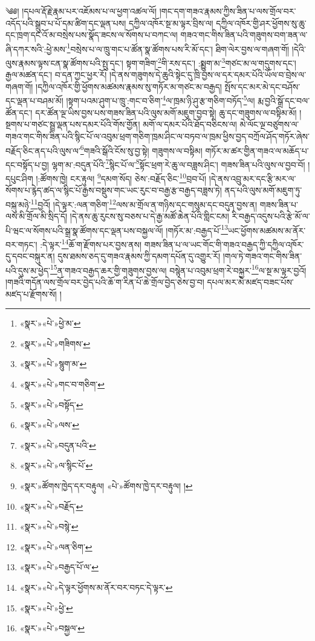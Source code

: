 ༄༅། །དཔལ་རྡོ་རྗེ་རྣམ་པར་འཇོམས་པ་ལ་ཕྱག་འཚལ་ལོ། །གང་དག་གཟའ་རྣམས་ཀྱིས་ཟིན་པ་ལས་གྲོལ་བར་འདོད་པའི་སྒྲུབ་པ་པོ་དམ་ཚིག་དང་ལྡན་པས། དཀྱིལ་འཁོར་སྔ་མ་ལྟར་བྲིས་ལ། དཀྱིལ་འཁོར་གྱི་ཤར་ཕྱོགས་སུ་ཆུ་དང་ཁྲག་དང་འོ་མ་བསྲེས་པས་སྣོད་ཟངས་ལ་སོགས་པ་བཀང་ལ། གཟའ་གང་གིས་ཟིན་པའི་གཟུགས་བག་ཟན་ལ་ཞི་དཀར་སའི་:ཕྱེ་མས་\footnote{«སྣར་»«པེ་»ཕྱེ་མ་}བསྲེས་པ་ལ་ཁྲུ་གང་པ་ཚོན་སྣ་ཚོགས་པས་རི་མོ་དང་། ཐིག་ལེར་བྱས་ལ་གཞག་གོ། །དེའི་ལུས་རྣམས་ལྟས་ངན་སྣ་ཚོགས་པའི་སྤུ་དང་། སྟག་གཟིག་\footnote{«སྣར་»«པེ་»གཟིགས་}གི་རས་དང་། :སྨྱུག་མ་\footnote{«སྣར་»«པེ་»སྙུག་མ་}གཙང་མ་ལ་གདུགས་དང་། རྒྱལ་མཚན་དང་། བ་དན་ཀྱང་ཕྱར་རོ། །དེ་ནས་གཟུགས་དེ་ཆུའི་སྟེང་དུ་ཁྲི་བྱས་ལ་དར་དམར་པོའི་ཡོལ་བ་བྲེས་ལ་གཞག་གོ། །དཀྱིལ་འཁོར་གྱི་ཕྱོགས་མཚམས་རྣམས་སུ་གཏོར་མ་གཙང་མ་བརྒྱད། སྤོས་དང་མར་མེ་དང་བཤོས་དང་ལྡན་པ་བཤམ་མོ། །སྟག་པའམ་ཤུག་པ་ཁྲུ་:གང་བ་ཅིག་\footnote{«སྣར་»«པེ་»གང་བ་གཅིག་}ལ་ཁྲམ་ཉི་ཤུ་རྩ་གཅིག་བཏོད་\footnote{«སྣར་»«པེ་»བསྟོད་}ལ། རྨ་བྱའི་སྒྲོ་དང་བལ་ཚོན་དང་། དར་ཚོན་ལྔ་ཡིས་བྱས་པས་གཟས་ཟིན་པའི་ལུས་མགོ་མཇུག་བྱབ་སྟེ། ཆུ་དང་གཟུགས་ལ་བསྟིམ་མོ། །སྔགས་པ་གཙང་སྦྲ་ལྡན་པས་དམར་པོའི་གོས་གྱོན། མགོ་ལ་དམར་པོའི་ཐོད་བཅིངས་ལ། མེ་ལོང་ལྔ་བཙུགས་ལ་གཟའ་གང་གིས་ཟིན་པའི་སྙིང་པོ་ལ་འབུམ་ཕྲག་གཅིག་ཁྲམ་ཤིང་ལ་བཏབ་ལ་ཁྲམ་ཕྱིས་བྱད་བཀྲོལ་ཤོད་གཏོར་ཞེས་བརྗོད་ཅིང་ནད་པའི་ལུས་ལ་\footnote{«སྣར་»«པེ་»ལས་}གཟའི་སྒོའི་ངོས་སུ་བྱ་སྟེ། གཟུགས་ལ་བསྟིམ། གཏོར་མ་ཚར་གྱིན་གཟའ་ལ་མཆོད་པ་དང་བསྟོད་པ་བྱ། ལྷག་མ་:བདུན་པོའི་\footnote{«སྣར་»«པེ་»བདུན་པའི་}སྙིང་པོ་ལ་\footnote{«སྣར་»«པེ་»ལ་སྙིང་པོ་}སྟོང་ཕྲག་རེ་ཆུ་ལ་བཟླས་ཤིང་། གཟས་ཟིན་པའི་ལུས་ལ་བྱབ་བོ། །དཔུང་ཤིག །:ཚོགས་ཁྱེ། ངར་རྟུལ། \footnote{«སྣར་»ཚོགས་ཁྱེད་དར་བརྟུལ། «པེ་»ཚོགས་ཁྱེ་དར་བརྟུལ། ། }དམག་སོད། ཅེས་:བརྗོད་ཅིང་\footnote{«སྣར་»«པེ་»བརྗོད་}བྲབ་པོ། །དེ་ནས་འབྲུ་མར་དང་རྩི་མར་ལ་སོགས་པ་རྙེད་ཚད་ལ་སྙིང་པོ་རྒྱས་བསྡུས་གང་ཡང་རུང་བ་བརྒྱ་རྩ་བརྒྱད་བཟླས་ཏེ། ནད་པའི་ལུས་མགོ་མཇུག་ཏུ་བསྐུ་མཉེ་\footnote{«སྣར་»«པེ་»བསྙེ་}བྱའོ། །དེ་ལྟར་:ལན་གཅིག་\footnote{«སྣར་»«པེ་»ལན་ཅིག་}ལས་མ་གྲོལ་ན་གཉིས་དང་གསུམ་དང་བདུན་བྱས་ན། གཟས་ཟིན་པ་ལས་མི་གྲོལ་མི་སྲིད་དོ། །དེ་ནས་ཆུ་རུངས་སུ་བཅས་པ་དེ་རྒྱ་མཚོ་ཆེན་པོའི་གླིང་ངམ། རི་བརྒྱད་འདུས་པའི་རྩེ་མོ་ལ་པི་ཝང་ལ་སོགས་པའི་སྒྲ་སྣ་ཚོགས་དང་ལྡན་པས་བསྐྱལ་ལོ། །གཏོར་མ་:བརྒྱད་པོ་\footnote{«སྣར་»«པེ་»བརྒྱད་པོ་ལ་}ཡང་ཕྱོགས་མཚམས་མ་ནོར་བར་གཏང་། :དེ་ལྟར་\footnote{«སྣར་»«པེ་»དེ་ལྟར་ཕྱོགས་མ་ནོར་བར་བཏང་དེ་ལྟར་}ཆོ་ག་རྫོགས་པར་བྱས་ནས། གཟས་ཟིན་པ་ལ་ཡང་གོང་གི་གཟའ་བརྒྱད་ཀྱི་དཀྱིལ་འཁོར་དུ་དབང་བསྐུར་ན། དུས་ཐམས་ཅད་དུ་གཟའ་རྣམས་ཀྱི་དམག་དཔོན་དུ་འགྱུར་རོ། །གལ་ཏེ་གཟའ་གང་གིས་ཟིན་པའི་དུས་མ་ཕྱེད་\footnote{«སྣར་»«པེ་»ཕྱེ་}ན་གཟའ་བརྒྱད་ཆར་གྱི་གཟུགས་བྱས་ལ། བསྙེན་པ་འབུམ་ཕྲག་རེ་བསྐྱར་\footnote{«སྣར་»«པེ་»བསྐྱལ་}ལ་སྔ་མ་ལྟར་བྱའོ། །གཟའི་གདོན་ལས་གྲོལ་བར་བྱེད་པའི་ཆོ་ག་རིན་པོ་ཆེ་གྲོལ་བྱེད་ཅེས་བྱ་བ། དཔལ་མར་མེ་མཛད་བཟང་པོས་མཛད་པ་རྫོགས་སོ། ། 